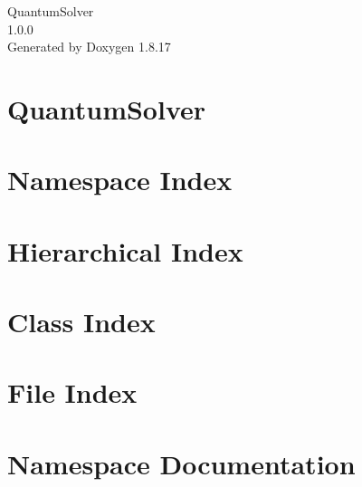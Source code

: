 \let\mypdfximage\pdfximage\def\pdfximage{\immediate\mypdfximage}\documentclass[twoside]{book}
\newcommand{\+}{\discretionary{\mbox{\scriptsize$\hookleftarrow$}}{}{}}
\newcommand{\clearemptydoublepage}{%
  \newpage{\pagestyle{empty}\cleardoublepage}%
}
\begin{document}
\hypersetup{pageanchor=false,
             bookmarksnumbered=true,
             pdfencoding=unicode
            }
\begin{titlepage}
\vspace*{7cm}
\begin{center}%
{\Large Quantum\+Solver \\[1ex]\large 1.\+0.\+0 }\\
\vspace*{1cm}
{\large Generated by Doxygen 1.8.17}\\
\end{center}
\end{titlepage}
\clearemptydoublepage
{}
\tableofcontents
\clearemptydoublepage
{}
\hypersetup{pageanchor=true}

\chapter{Quantum\+Solver}
\label{index}\hypertarget{index}{}
\chapter{Namespace Index}

\chapter{Hierarchical Index}

\chapter{Class Index}

\chapter{File Index}

\chapter{Namespace Documentation}






















\end{document}
